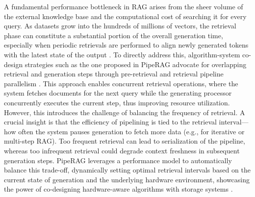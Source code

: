 \documentclass[11pt]{article}
\begin{document}
A fundamental performance bottleneck in RAG arises from the sheer volume of the external knowledge base and the computational cost of searching it for every query. As datasets grow into the hundreds of millions of vectors, the retrieval phase can constitute a substantial portion of the overall generation time, especially when periodic retrievals are performed to align newly generated tokens with the latest state of the output \cite{ref57,ref58}. To directly address this, algorithm-system co-design strategies such as the one proposed in PipeRAG advocate for overlapping retrieval and generation steps through pre-retrieval and retrieval pipeline parallelism \cite{ref57}. This approach enables concurrent retrieval operations, where the system fetches documents for the next query while the generating processor concurrently executes the current step, thus improving resource utilization. However, this introduces the challenge of balancing the frequency of retrieval. A crucial insight is that the efficiency of pipelining is tied to the retrieval interval---how often the system pauses generation to fetch more data (e.g., for iterative or multi-step RAG). Too frequent retrieval can lead to serialization of the pipeline, whereas too infrequent retrieval could degrade context freshness in subsequent generation steps. PipeRAG leverages a performance model to automatically balance this trade-off, dynamically setting optimal retrieval intervals based on the current state of generation and the underlying hardware environment, showcasing the power of co-designing hardware-aware algorithms with storage systems \cite{ref57}.
\end{document}
